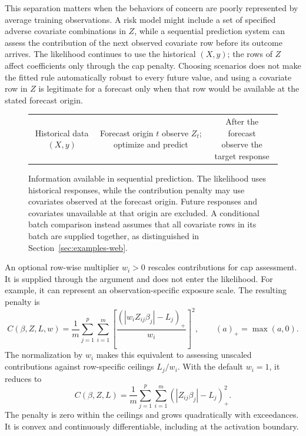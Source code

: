 \documentclass[article,shortnames,nofooter]{jss}
\begin{document}
This separation matters when the behaviors of concern are poorly represented by average training observations. A risk model might include a set of specified adverse covariate combinations in $Z$, while a sequential prediction system can assess the contribution of the next observed covariate row before its outcome arrives. The likelihood continues to use the historical $(X,y)$; the rows of $Z$ affect coefficients only through the cap penalty. Choosing scenarios does not make the fitted rule automatically robust to every future value, and using a covariate row in $Z$ is legitimate for a forecast only when that row would be available at the stated forecast origin.

\begin{figure}[ht]
\centering
\small
\begin{tabular}{c@{\;$\longrightarrow$\;}c@{\;$\longrightarrow$\;}c}
\shortstack{Historical data\\$(X,y)$} &
\shortstack{Forecast origin $t$\\observe $Z_t$; optimize and predict} &
\shortstack{After the forecast\\observe the target response}
\end{tabular}
\caption{Information available in sequential prediction. The likelihood uses historical responses, while the contribution penalty may use covariates observed at the forecast origin. Future responses and covariates unavailable at that origin are excluded. A conditional batch comparison instead assumes that all covariate rows in its batch are supplied together, as distinguished in Section~\ref{sec:examples-web}.}
\label{fig:timing}
\end{figure}

An optional row-wise multiplier $w_i>0$ rescales contributions for cap assessment. It is supplied through the  argument and does not enter the likelihood. For example, it can represent an observation-specific exposure scale. The resulting penalty is
\begin{equation}
C(\beta,Z,L,w)=\frac{1}{m}\sum_{j=1}^p\sum_{i=1}^m
\left[\frac{(|w_iZ_{ij}\beta_j|-L_j)_+}{w_i}\right]^2,
\qquad (a)_+=\max(a,0).
\label{eq:weighted-cap}
\end{equation}
The normalization by $w_i$ makes this equivalent to assessing unscaled contributions against row-specific ceilings $L_j/w_i$. With the default $w_i=1$, it reduces to
\begin{equation}
C(\beta,Z,L)=\frac{1}{m}\sum_{j=1}^p\sum_{i=1}^m
(|Z_{ij}\beta_j|-L_j)_+^2.
\label{eq:cap}
\end{equation}
The penalty is zero within the ceilings and grows quadratically with exceedances. It is convex and continuously differentiable, including at the activation boundary.
\end{document}
